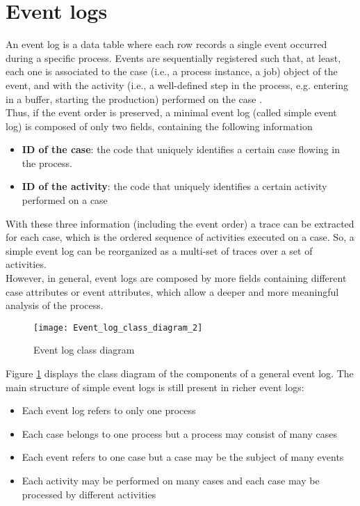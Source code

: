 \section{Event logs}
\label{Event logs}
An event log is a data table where each row records a single event occurred during a specific process. Events are sequentially registered such that, at least, each one is associated to the case (i.e., a process instance, a job) object of the event, and with the activity (i.e., a well-defined step in the process, e.g. entering in a buffer, starting the production) performed on the case \cite{BoseR.P.JagadeeshChandra2013Wipm}. \\ 
Thus, if the event order is preserved, a minimal event log (called simple event log) is composed of only two fields, containing the following information 
\begin{itemize}
\item \textbf{ID of the case}: the code that uniquely identifies a certain case flowing in the process. 
\item \textbf{ID of the activity}: the code that uniquely identifies a certain activity performed on a case
\end{itemize}
With these three information (including the event order) a trace can be extracted for each case, which is the ordered sequence of activities executed on a case. So, a simple event log can be reorganized as a multi-set of traces over a set of activities.\\
However, in general, event logs are composed by more fields containing different case attributes or event attributes, which allow a deeper and more meaningful analysis of the process.
\begin{figure}[H] 
\centering    
\texttt{[image: Event\_log\_class\_diagram\_2]}
\caption[Event log class diagram]{Event log class diagram \cite{Aalst16}}
\label{fig:Event log class diagram}
\end{figure}
Figure \ref{fig:Event log class diagram} displays the class diagram of the components of a general event log. The main structure of simple event logs is still present in richer event logs:
\begin{itemize}
\item Each event log refers to only one process
\item Each case belongs to one process but a process may consist of many cases
\item Each event refers to one case but a case may be the subject of many events
\item Each activity may be performed on many cases and each case may be processed by different activities
\end{itemize}

